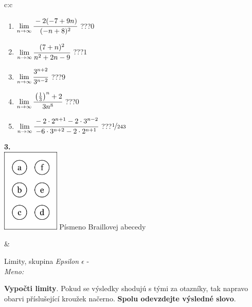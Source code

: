 \documentclass[10pt]{report}
\begin{document}
\begin{tabular}{c:c}
\begin{minipage}[c][104.5mm][t]{0.5\linewidth}
\begin{center}
\begin{minipage}{0.79\linewidth}
\begin{center}
\begin{varwidth}{\linewidth}
\begin{enumerate}
\item $\lim\limits_{n\to\infty}\cfrac{-2(-7+9n)}{(-n+8)^2}$\quad \dotfill\; ???\;\dotfill \quad $0$
\item $\lim\limits_{n\to\infty}\cfrac{(7+n)^2}{n^2+2n-9}$\quad \dotfill\; ???\;\dotfill \quad $1$
\item $\lim\limits_{n\to\infty}\cfrac{3^{n+2}}{3^{n-2}}$\quad \dotfill\; ???\;\dotfill \quad $9$
\item $\lim\limits_{n\to\infty}\cfrac{\left(\frac{1}{3}\right)^n +2}{3n^{8}}$\quad \dotfill\; ???\;\dotfill \quad $0$
\item $\lim\limits_{n\to\infty}\cfrac{-2\cdot 2^{n+1}-2\cdot 3^{n-2}}{-6\cdot 3^{n+2}-2\cdot 2^{n+1}}$\quad \dotfill\; ???\;\dotfill \quad $\nicefrac{1}{243}$
\end{enumerate}
\end{varwidth}
\end{center}
\end{minipage}
\begin{minipage}{0.20\linewidth}
\begin{center}
{\Huge\bfseries 3.} \\[2mm]
\includegraphics[height=40mm]{../images/braille.png}
{\small Písmeno Braillovej abecedy}
\end{center}
\end{minipage}
\end{center}
\end{minipage}
&
\begin{minipage}[c][104.5mm][t]{0.5\linewidth}
\begin{center}
\vspace{7mm}
{\huge Limity, skupina \textit{Epsilon $\epsilon$} -}\\[5mm]
\textit{Meno:}\phantom{xxxxxxxxxxxxxxxxxxxxxxxxxxxxxxxxxxxxxxxxxxxxxxxxxxxxxxxxxxxxxxxxx}\\[5mm]
\begin{minipage}{0.95\linewidth}
\begin{center}
\textbf{Vypočti limity}. Pokud se výsledky shodujú s tými za otazníky, tak napravo\\obarvi příslušející kroužek načerno. \textbf{Spolu odevzdejte výsledné slovo}.

\end{center}
\end{minipage}
\end{center}
\end{minipage}
\end{tabular}
\end{document}
